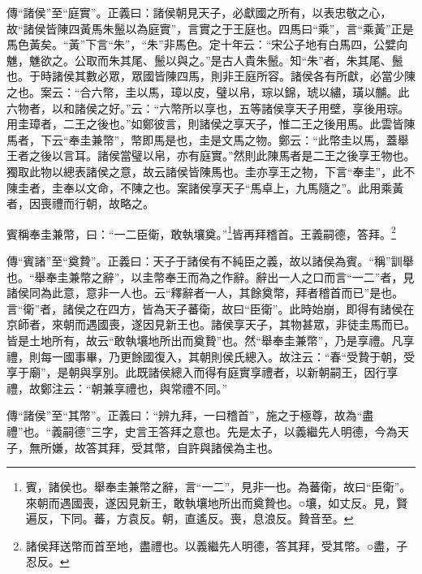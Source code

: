 {\noindent\zhuan{}\fzbyks 傳“諸侯”至“庭實”。正義曰：諸侯朝見天子，必獻國之所有，以表忠敬之心，故“諸侯皆陳四黃馬朱鬛以為庭實”，言實之于王庭也。四馬曰“乘”，言“乘黃”正是馬色黃矣。“黃”下言“朱”，“朱”非馬色。定十年云：“宋公子地有白馬四，公嬖向魋，魋欲之。公取而朱其尾、鬛以與之。”是古人貴朱鬛。知“朱”者，朱其尾、鬛也。于時諸侯其數必眾，眾國皆陳四馬，則非王庭所容。諸侯各有所獻，必當少陳之也。案云：“合六幣，圭以馬，璋以皮，璧以帛，琮以錦，琥以繡，璜以黼。此六物者，以和諸侯之好。”云：“六幣所以享也，五等諸侯享天子用壁，享後用琮。用圭璋者，二王之後也。”如鄭彼言，則諸侯之享天子，惟二王之後用馬。此雲皆陳馬者，下云“奉圭兼幣”，幣即馬是也，圭是文馬之物。鄭云：“此幣圭以馬，蓋舉王者之後以言耳。諸侯當璧以帛，亦有庭實。”然則此陳馬者是二王之後享王物也。獨取此物以總表諸侯之意，故云諸侯皆陳馬也。圭亦享王之物，下言“奉圭”，此不陳圭者，圭奉以文命，不陳之也。案諸侯享天子“馬卓上，九馬隨之”。此用乘黃者，因喪禮而行朝，故略之。 \par}

賓稱奉圭兼幣，曰：“一二臣衛，敢執壤奠。”\footnote{賓，諸侯也。舉奉圭兼幣之辭，言“一二”，見非一也。為蕃衛，故曰“臣衛”。來朝而遇國喪，遂因見新王，敢執壤地所出而奠贄也。○壤，如丈反。見，賢遍反，下同。蕃，方袁反。朝，直遙反。喪，息浪反。贄音至。}皆再拜稽首。王義嗣德，答拜。\footnote{諸侯拜送幣而首至地，盡禮也。以義繼先人明德，答其拜，受其幣。○盡，子忍反。}

{\noindent\zhuan{}\fzbyks 傳“賓諸”至“奠贄”。正義曰：天子于諸侯有不純臣之義，故以諸侯為賓。“稱”訓舉也。“舉奉圭兼幣之辭”，以圭幣奉王而為之作辭。辭出一人之口而言“一二”者，見諸侯同為此意，意非一人也。云“釋辭者一人，其餘奠幣，拜者稽首而已”是也。言“衛”者，諸侯之在四方，皆為天子蕃衛，故曰“臣衛”。此時始崩，即得有諸侯在京師者，來朝而遇國喪，遂因見新王也。諸侯享天子，其物甚眾，非徒圭馬而已。皆是土地所有，故云“敢執壤地所出而奠贄”也。然“舉奉圭兼幣”，乃是享禮。凡享禮，則每一國事畢，乃更餘國復入，其朝則侯氏總入。故注云：“春“受贄于朝，受享于廟”，是朝與享別。此既諸侯總入而得有庭實享禮者，以新朝嗣王，因行享禮，故鄭注云：“朝兼享禮也，與常禮不同。” \par}

{\noindent\zhuan{}\fzbyks 傳“諸侯”至“其幣”。正義曰：“辨九拜，一曰稽首”，施之于極尊，故為“盡禮”也。“義嗣德”三字，史言王答拜之意也。先是太子，以義繼先人明德，今為天子，無所嫌，故答其拜，受其幣，自許與諸侯為主也。 \par}

